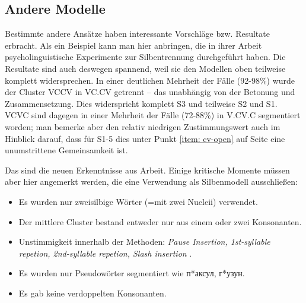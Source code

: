 \documentclass[12pt,headsepline,a4paper]{scrartcl}
\newcommand\textcyr[1]{{\fontencoding{OT2}\fontfamily{wncyr}\selectfont #1}}
\begin{document}
\subsection{Andere Modelle}
Bestimmte andere Ansätze haben interessante Vorschläge bzw. Resultate erbracht. Als ein Beispiel kann man hier \textcite{cote2011} anbringen, die in ihrer Arbeit psycholinguistische Experimente zur Silbentrennung durchgeführt haben. Die Resultate sind auch deswegen spannend, weil sie den Modellen oben teilweise komplett widersprechen. In einer deutlichen Mehrheit der Fälle (92-98\%) wurde der Cluster VCCV in VC.CV getrennt -- das unabhängig von der Betonung und Zusammensetzung. Dies widerspricht komplett S3 und teilweise S2 und S1. VCVC sind dagegen in einer Mehrheit der Fälle (72-88\%) in V.CV.C segmentiert worden; man bemerke aber den relativ niedrigen Zustimmungswert auch im Hinblick darauf, dass für S1-5 dies unter Punkt \ref{item: cv-open} auf Seite \pageref{sec: sylmodels} eine unumstrittene Gemeinsamkeit ist.

Das sind die neuen Erkenntnisse aus Arbeit.  Einige kritische Momente müssen aber hier angemerkt werden, die eine Verwendung als Silbenmodell ausschließen:
\begin{itemize}
  \item Es wurden nur zweisilbige Wörter (=mit zwei Nucleii) verwendet.
  \item Der mittlere Cluster bestand entweder nur aus einem oder zwei Konsonanten.
  \item Unstimmigkeit innerhalb der Methoden: \textit{Pause Insertion, 1st-syllable repetion, 2nd-syllable repetion, Slash insertion} \autocite[281--282]{cote2011}.
  \item Es wurden nur Pseudowörter segmentiert wie \textcyr{п*{а}ксул, г*{у}зун}.
  \item Es gab keine verdoppelten Konsonanten.
\end{itemize}
\end{document}
